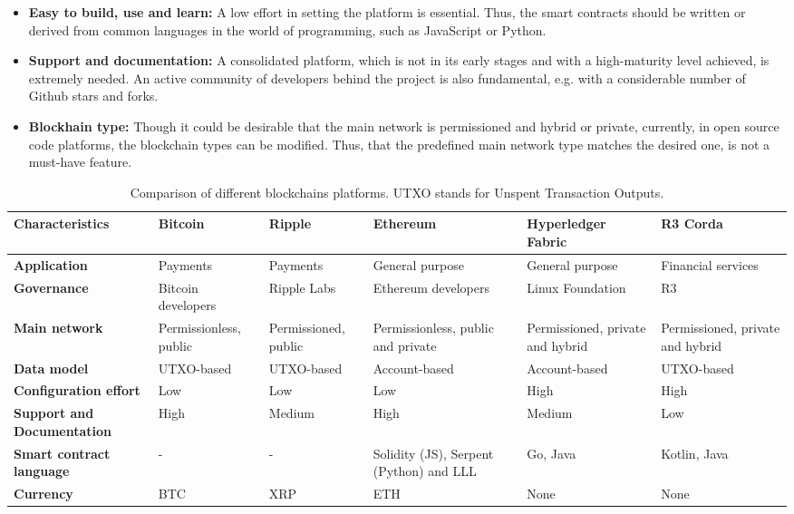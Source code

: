 \begin{itemize}
    \item \textbf{Easy to build, use and learn:} A low effort in setting the platform is essential. Thus, the smart contracts should be written or derived from common languages in the world of programming, such as JavaScript or Python.
    \item \textbf{Support and documentation:} A consolidated platform, which is not in its early stages and with a high-maturity level achieved, is extremely needed. An active community of developers behind the project is also fundamental, e.g. with a considerable number of Github stars and forks.
    \item \textbf{Blockhain type:} Though it could be desirable that the main network is permissioned and hybrid or private, currently, in open source code platforms, the blockchain types can be modified. Thus, that the predefined main network type matches the desired one, is not a must-have feature.
\end{itemize}

\begin{table}[bth]
	\myfloatalign \footnotesize
	\begin{tabularx}{\textwidth}{>{\raggedright\arraybackslash}p{2.5cm}>{\raggedright\arraybackslash}p{2.5cm}>{\raggedright\arraybackslash}p{2.5cm}>{\raggedright\arraybackslash}p{2.5cm}>{\raggedright\arraybackslash}p{2.5cm}>{\raggedright\arraybackslash}p{2.5cm}}
		\textbf{Characteristics} & \textbf{Bitcoin} & \textbf{Ripple} & \textbf{Ethereum} & \textbf{Hyperledger Fabric} & \textbf{R3 Corda}\\ 
		\hline
		\textbf{Application} & Payments & Payments & General purpose & General purpose & Financial services \\
		\textbf{Governance} & Bitcoin developers & Ripple Labs & Ethereum developers & Linux Foundation & R3 \\
		\textbf{Main network} & Permissionless, public & Permissioned, public & Permissionless, public and private & Permissioned, private and hybrid & Permissioned, private and hybrid \\
		\textbf{Data model} & UTXO-based & UTXO-based & Account-based & Account-based & UTXO-based \\
		\textbf{Configuration effort} & Low & Low & Low & High & High \\
		\textbf{Support and Documentation} & High & Medium & High & Medium & Low \\
		\textbf{Smart contract language} & - & - & Solidity (JS), Serpent (Python) and LLL & Go, Java & Kotlin, Java \\
		\textbf{Currency} & BTC & XRP & ETH & None & None \\
	\hline
	\end{tabularx}
		\caption{Comparison of different blockchains platforms. UTXO stands for Unspent Transaction Outputs.}
	\label{tab:blockchainComparison}
\end{table}


